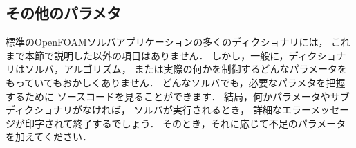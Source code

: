 \subsection{その他のパラメタ}
\label{ssec:4.5.4}
標準のOpenFOAMソルバアプリケーションの多くのディクショナリには，
これまで本節で説明した以外の項目はありません．
しかし，一般に，ディクショナリはソルバ，アルゴリズム，
または実際の何かを制御するどんなパラメータをもっていてもおかしくありません．
どんなソルバでも，必要なパラメタを把握するために
ソースコードを見ることができます．
結局，何かパラメータやサブディクショナリがなければ，
ソルバが実行されるとき，
詳細なエラーメッセージが印字されて終了するでしょう．
そのとき，それに応じて不足のパラメータを加えてください．

